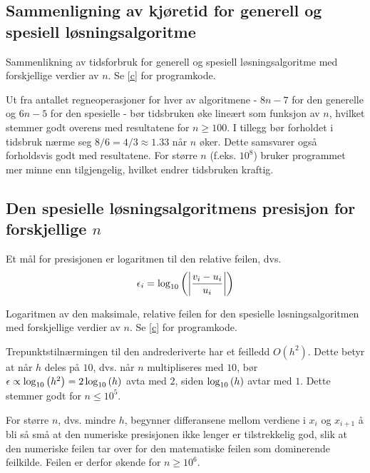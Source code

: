 \documentclass[12pt,norsk,a4paper]{report}
\begin{document}
\subsection{Sammenligning av kjøretid for generell og spesiell løsningsalgoritme}

\begin{table}[H]
\centering
\caption{Sammenlikning av tidsforbruk for generell og spesiell løsningsalgoritme med forskjellige verdier av \(n\). Se \vref{c} for programkode.}
\label{cpugenspes}

\end{table}

Ut fra antallet regneoperasjoner for hver av algoritmene - \(8n-7\) for den generelle og \(6n-5\) for den spesielle - bør tidsbruken øke lineært som funksjon av \(n\), hvilket stemmer godt overens med resultatene for \(n\geq100\). I tillegg bør forholdet i tidsbruk nærme seg \(8/6=4/3\approx\num{1.33}\) når \(n\) øker. Dette samsvarer også forholdsvis godt med resultatene. For større \(n\) (f.eks. \(10^8\)) bruker programmet mer minne enn tilgjengelig, hvilket endrer tidsbruken kraftig.

\subsection{Den spesielle løsningsalgoritmens presisjon for forskjellige \(n\)}
Et mål for presisjonen er logaritmen til den relative feilen, dvs.
\[
\epsilon_i = \log_{10}\qty(\abs{\frac{v_i-u_i}{u_i}})
\]

\begin{table}[H]
\centering
\caption{Logaritmen av den maksimale, relative feilen for den spesielle løsningsalgoritmen med forskjellige verdier av \(n\). Se \vref{c} for programkode.}
\label{presisjon}

\end{table}

Trepunktstilnærmingen til den andrederiverte har et feilledd \(O(h^2)\). Dette betyr at når \(h\) deles på \(10\), dvs. når \(n\) multipliseres med \(10\), bør \(\epsilon\propto\log_{10}\qty(h^2)=2\log_{10}\qty(h)\) avta med \(2\), siden \(\log_{10}\qty(h)\) avtar med \(1\). Dette stemmer godt for \(n\leq10^5\).

For større \(n\), dvs. mindre \(h\), begynner differansene mellom verdiene i \(x_i\) og \(x_{i+1}\) å bli så små at den numeriske presisjonen ikke lenger er tilstrekkelig god, slik at den numeriske feilen tar over for den matematiske feilen som dominerende feilkilde. Feilen er derfor økende for \(n\geq10^6\).
\end{document}
